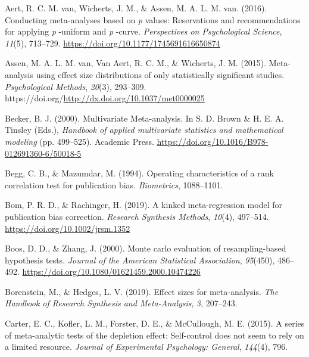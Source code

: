 \documentclass[
  american,
  man, donotrepeattitle,floatsintext]{apa7}
\newlength{\cslhangindent}
\newenvironment{CSLReferences}[2] %
 {\begin{list}{}{%
  \setlength{\itemindent}{0pt}
  \setlength{\leftmargin}{0pt}
  \setlength{\parsep}{0pt}
  \ifodd #1
   \setlength{\leftmargin}{\cslhangindent}
   \setlength{\itemindent}{-1\cslhangindent}
  \fi
  \setlength{\itemsep}{#2\baselineskip}}}
 {\end{list}}
\begin{document}
\protect{}\label{refs}
\begin{CSLReferences}{1}{0}
Aert, R. C. M. van, Wicherts, J. M., \& Assen, M. A. L. M. van. (2016). Conducting meta-analyses based on \emph{p} values: Reservations and recommendations for applying \emph{p} -uniform and \emph{p} -curve. \emph{Perspectives on Psychological Science}, \emph{11}(5), 713--729. \url{https://doi.org/10.1177/1745691616650874}

Assen, M. A. L. M. van, Van Aert, R. C. M., \& Wicherts, J. M. (2015). {Meta-analysis using effect size distributions of only statistically significant studies}. \emph{Psychological Methods}, \emph{20}(3), 293--309. https://doi.org/\url{http://dx.doi.org/10.1037/met0000025}

Becker, B. J. (2000). {Multivariate Meta-analysis}. In S. D. Brown \& H. E. A. Tinsley (Eds.), \emph{Handbook of applied multivariate statistics and mathematical modeling} (pp. 499--525). Academic Press. \url{https://doi.org/10.1016/B978-012691360-6/50018-5}

Begg, C. B., \& Mazumdar, M. (1994). Operating characteristics of a rank correlation test for publication bias. \emph{Biometrics}, 1088--1101.

Bom, P. R. D., \& Rachinger, H. (2019). A kinked meta-regression model for publication bias correction. \emph{Research Synthesis Methods}, \emph{10}(4), 497--514. \url{https://doi.org/10.1002/jrsm.1352}

Boos, D. D., \& Zhang, J. (2000). Monte carlo evaluation of resampling-based hypothesis tests. \emph{Journal of the American Statistical Association}, \emph{95}(450), 486--492. \url{https://doi.org/10.1080/01621459.2000.10474226}

Borenstein, M., \& Hedges, L. V. (2019). Effect sizes for meta-analysis. \emph{The Handbook of Research Synthesis and Meta-Analysis}, \emph{3}, 207--243.

Carter, E. C., Kofler, L. M., Forster, D. E., \& McCullough, M. E. (2015). A series of meta-analytic tests of the depletion effect: Self-control does not seem to rely on a limited resource. \emph{Journal of Experimental Psychology: General}, \emph{144}(4), 796.


\end{CSLReferences}
\end{document}
